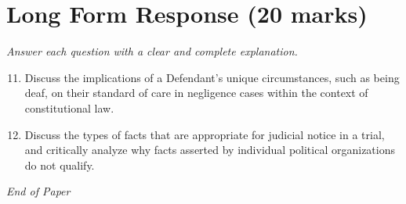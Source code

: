 \documentclass[12pt]{article}
\begin{document}
\section*{Long Form Response (20 marks)}
\textit{Answer each question with a clear and complete explanation.}
\begin{enumerate}[label=\arabic*.]
\setcounter{enumi}{10}
\item Discuss the implications of a Defendant's unique circumstances, such as being deaf, on their standard of care in negligence cases within the context of constitutional law.
\item Discuss the types of facts that are appropriate for judicial notice in a trial, and critically analyze why facts asserted by individual political organizations do not qualify.
\end{enumerate}

\vfill
\noindent\textit{End of Paper}
\end{document}
